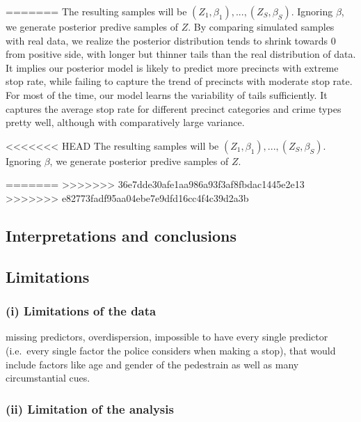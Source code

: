 \documentclass[]{article}
\begin{document}
=======
The resulting samples will be \((Z_1, \beta_1), ..., (Z_S, \beta_S)\).
Ignoring \(\beta\), we generate posterior predive samples of \(Z\). By
comparing simulated samples with real data, we realize the posterior
distribution tends to shrink towards 0 from positive side, with longer
but thinner tails than the real distribution of data. It implies our
posterior model is likely to predict more precincts with extreme stop
rate, while failing to capture the trend of precincts with moderate stop
rate. For most of the time, our model learns the variability of tails
sufficiently. It captures the average stop rate for different precinct
categories and crime types pretty well, although with comparatively
large variance.

<<<<<<< HEAD
The resulting samples will be \((Z_1, \beta_1), ..., (Z_S, \beta_S)\).
Ignoring \(\beta\), we generate posterior predive samples of \(Z\).

=======
>>>>>>> 36e7dde30afe1aa986a93f3af8fbdac1445e2e13
>>>>>>> e82773fadf95aa04ebe7e9dfd16cc4f4c39d2a3b
\hypertarget{interpretations-and-conclusions}{%
\subsection{Interpretations and
conclusions}\label{interpretations-and-conclusions}}

\hypertarget{limitations}{%
\subsection{Limitations}\label{limitations}}

\hypertarget{i-limitations-of-the-data}{%
\subsubsection{(i) Limitations of the
data}\label{i-limitations-of-the-data}}

missing predictors, overdispersion, impossible to have every single
predictor (i.e.~every single factor the police considers when making a
stop), that would include factors like age and gender of the pedestrain
as well as many circumstantial cues.

\hypertarget{ii-limitation-of-the-analysis}{%
\subsubsection{(ii) Limitation of the
analysis}\label{ii-limitation-of-the-analysis}}
\end{document}
